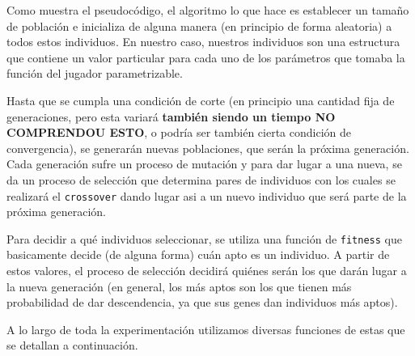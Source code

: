\documentclass[A4paper,oneside,fleqn,11pt]{article}
\theoremstyle{definition}
\begin{document}
Como muestra el pseudocódigo, el algoritmo lo que hace es establecer un tamaño de población e inicializa de alguna manera (en principio de forma aleatoria) a todos estos individuos. En nuestro caso, nuestros individuos son una estructura que contiene un valor particular para cada uno de los parámetros que tomaba la función del jugador parametrizable.

Hasta que se cumpla una condición de corte (en principio una cantidad fija de generaciones, pero esta variará\textbf{ también siendo un tiempo NO COMPRENDOU ESTO}, o podría ser también cierta condición de convergencia), se generarán nuevas poblaciones, que serán la próxima generación. Cada generación sufre un proceso de mutación y para dar lugar a una nueva, se da un proceso de selección que determina pares de individuos con los cuales se realizará el \texttt{crossover} dando lugar asi a un nuevo individuo que será parte de la próxima generación.

Para decidir a qué individuos seleccionar, se utiliza una función de \texttt{fitness} que basicamente decide (de alguna forma) cuán apto es un individuo. A partir de estos valores, el proceso de selección decidirá quiénes serán los que darán lugar a la nueva generación (en general, los más aptos son los que tienen más probabilidad de dar descendencia, ya que sus genes dan individuos más aptos).

A lo largo de toda la experimentación utilizamos diversas funciones de estas que se detallan a continuación.
\end{document}
